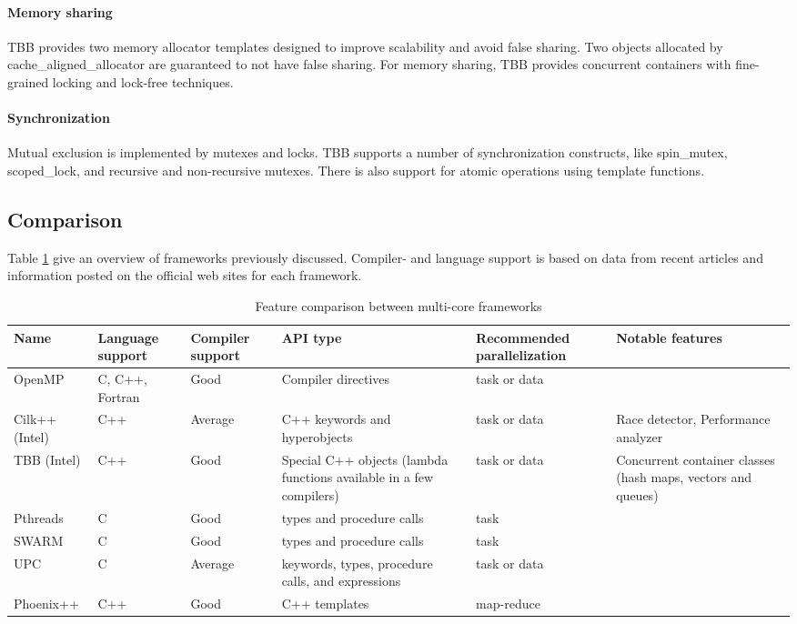 \paragraph{Memory sharing} TBB provides two memory allocator templates
designed to improve scalability and avoid false sharing. Two objects
allocated by cache\_aligned\_allocator are guaranteed to not have
false sharing. For memory sharing, TBB provides concurrent containers
with fine-grained locking and lock-free techniques. 

\paragraph{Synchronization} Mutual exclusion is implemented by mutexes
and locks. TBB supports a number of synchronization constructs, like
spin\_mutex, scoped\_lock, and recursive and non-recursive mutexes.
There is also support for atomic operations using template functions.

\subsection{Comparison}

Table \ref{tab:comparison} give an overview of frameworks previously
discussed. Compiler- and language support is based on data from recent
articles and information posted on the official web sites for each
framework.

\begin{table}[H]
	\centering
	\begin{tabular}{|p{2cm}|p{1.6cm}|p{1.7cm}|p{2.2cm}|p{2.5cm}|p{2cm}|}
		\hline
		Name & 
			Language support & 
			Compiler support \footnotemark & 
			API type & 
			Recommended parallelization & 
			Notable features \\
		\hline \hline
		OpenMP & 
			C, C++, Fortran & 
			Good & 
			Compiler directives &
			task or data & 
			\\ \hline
		Cilk++ (Intel) & 
			C++ & 
			Average & 
			C++ keywords and hyperobjects &
			task or data & 
			Race detector, Performance analyzer \\ \hline
		TBB (Intel) & 
			C++ & 
			Good & 
			Special C++ objects (lambda functions available in a few compilers) &
			task or data & 
			Concurrent container classes (hash maps, vectors and queues) \\ \hline
		Pthreads &
			C &
			Good &
			types and procedure calls &
			task &
			\\ \hline
		SWARM &
			C &
			Good &
			types and procedure calls &
			task &
			\\ \hline
		UPC &
			C &
			Average &
			keywords, types, procedure calls, and expressions &
			task or data &
			\\ \hline
		Phoenix++ &
			C++ &
			Good &
			C++ templates &
			map-reduce &
			\\ \hline

	\end{tabular}
	\caption{Feature comparison between multi-core frameworks}
	\label{tab:comparison}
\end{table}

